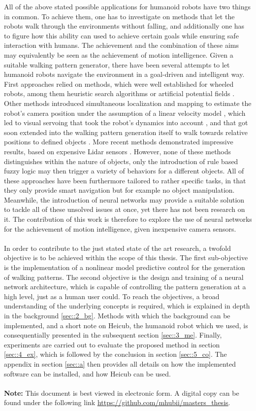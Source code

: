 All of the above stated possible applications for humanoid robots have two things in common. To achieve them, one has to investigate on methods that let the robots walk through the environments without falling, and additionally one has to figure how this ability can used to achieve certain goals while ensuring safe interaction with humans. The achievement and the combination of these aims may equivalently be seen as the achievement of motion intelligence. Given a suitable walking pattern generator, there have been several attempts to let humanoid robots navigate the environment in a goal-driven and intelligent way. First approaches relied on methods, which were well established for wheeled robots, among them heuristic search algorithms or artificial potential fields \cite{kuffner2005motion}. Other methods introduced simultaneous localization and mapping to estimate the robot's camera position under the assumption of a linear velocity model \cite{stasse2008integrating}, which led to visual servoing that took the robot's dynamics into account \cite{dune2010cancelling}, and that got soon extended into the walking pattern generation itself to walk towards relative positions to defined objects \cite{dune2011vision}. More recent methods demonstrated impressive results, based on expensive Lidar sensors \cite{griffin2019footstep}. However, none of these methods distinguishes within the nature of objects, only the introduction of rule based fuzzy logic \cite{dadios2012humanoid} may then trigger a variety of behaviors for a different objects. All of these approaches have been furthermore tailored to rather specific tasks, in that they only provide smart navigation but for example no object manipulation. Meanwhile, the introduction of neural networks may provide a suitable solution to tackle all of these unsolved issues at once, yet there has not been research on it. The contribution of this work is therefore to explore the use of neural networks for the achievement of motion intelligence, given inexpensive camera sensors.
\\\\
In order to contribute to the just stated state of the art research, a twofold objective is to be achieved within the scope of this thesis. The first sub-objective is the implementation of a nonlinear model predictive control for the generation of walking patterns. The second objective is the design and training of a neural network architecture, which is capable of controlling the pattern generation at a high level, just as a human user could. To reach the objectives, a broad understanding of the underlying concepts is required, which is explained in depth in the background \ref{sec::2_bg}. Methods with which the background can be implemented, and a short note on Heicub, the humanoid robot which we used, is consequentially presented in the subsequent section \ref{sec::3_me}. Finally, experiments are carried out to evaluate the proposed method in section \ref{sec::4_ex}, which is followed by the conclusion in section \ref{sec::5_co}. The appendix in section \ref{sec::a} then provides all details on how the implemented software can be installed, and how Heicub can be used.
\\\\
\textbf{Note:} This document is best viewed in electronic form. A digital copy can be found under the following link \href{https://github.com/mhubii/masters_thesis}{\underline{https://github.com/mhubii/masters\_thesis}}.
